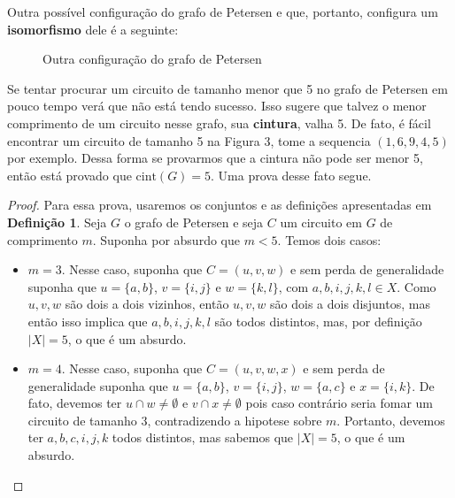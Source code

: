\documentclass[11pt,a4paper]{exam}
\begin{document}
Outra possível configuração do grafo de Petersen e que, portanto,
configura um \textbf{isomorfismo} dele é a seguinte: 
\begin{figure}[H]
    \centering
    \caption{Outra configuração do grafo de Petersen}
\end{figure}

Se tentar procurar um circuito de tamanho menor que 5 no grafo de
Petersen em pouco tempo verá que não está tendo sucesso. Isso sugere que
talvez o menor comprimento de um circuito nesse grafo, sua
\textbf{cintura}, valha 5. De fato, é fácil encontrar um circuito de tamanho 5 na
Figura 3, tome a sequencia $(1,6,9,4,5)$ por exemplo. Dessa forma se
provarmos que a cintura não pode ser menor 5, então está provado que 
$\text{cint}(G)=5$. Uma prova desse fato segue.
\begin{proof}
    Para essa prova, usaremos os conjuntos e as definições apresentadas
    em \textbf{Definição 1}.\newline
    Seja $G$ o grafo de Petersen e seja $C$ um circuito em $G$ de
    comprimento $m$. Suponha por absurdo que $m < 5$. Temos dois casos: 
    \begin{itemize}[label={}]
        \item $m = 3$. Nesse caso, suponha que $C = (u,v,w)$ e sem perda
            de generalidade suponha que $u =
            \{a,b\}$, $v =\{i,j\}$ e $w = \{k,l\}$, com $a,b,i,j,k,l \in
            X$. Como $u,v,w$ são dois a dois vizinhos, então $u,v,w$ são
            dois a dois disjuntos, mas então isso implica que
            $a,b,i,j,k,l$ são todos distintos, mas, por definição
            $|X|=5$, o que é um absurdo.
        \item $m=4$. Nesse caso, suponha que $C = (u,v,w,x)$ e sem perda
            de generalidade suponha que $u =
            \{a,b\}$, $v =\{i,j\}$, $w = \{a,c\}$ e $x = \{i,k\}$. De
            fato, devemos ter $u\cap w \neq \emptyset$ e $v \cap x \neq
            \emptyset $ pois caso contrário seria fomar um circuito de
            tamanho 3, contradizendo a hipotese sobre $m$. Portanto,
            devemos ter $a,b,c,i,j,k$ todos distintos, mas sabemos que
            $|X| = 5$, o que é um absurdo.
    \end{itemize}
\end{proof}
\end{document}
